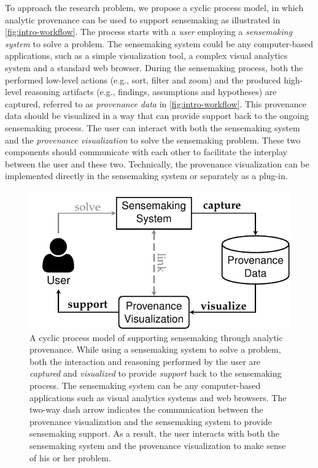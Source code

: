 To approach the research problem, we propose a cyclic process model, in which analytic provenance can be used to support sensemaking as illustrated in \autoref{fig:intro-workflow}. The process starts with a \emph{user} employing a \emph{sensemaking system} to solve a problem. The sensemaking system could be any computer-based applications, such as a simple visualization tool, a complex visual analytics system and a standard web browser. During the sensemaking process, both the performed low-level actions (e.g., sort, filter and zoom) and the produced high-level reasoning artifacts (e.g., findings, assumptions and hypotheses) are captured, referred to as \emph{provenance data} in \autoref{fig:intro-workflow}. This provenance data should be visualized in a way that can provide support back to the ongoing sensemaking process. The user can interact with both the sensemaking system and the \emph{provenance visualization} to solve the sensemaking problem. These two components should communicate with each other to facilitate the interplay between the user and these two. Technically, the provenance visualization can be implemented directly in the sensemaking system or separately as a plug-in.

\begin{figure}[!htb]
	\centering
	\includegraphics{workflow}
	\caption[A cyclic sensemaking-support model through analytic provenance]{A cyclic process model of supporting sensemaking through analytic provenance. While using a sensemaking system to solve a problem, both the interaction and reasoning performed by the user are \emph{captured} and \emph{visualized} to provide \emph{support} back to the sensemaking process. The sensemaking system can be any computer-based applications such as visual analytics systems and web browsers. The two-way dash arrow indicates the communication between the provenance visualization and the sensemaking system to provide sensemaking support. As a result, the user interacts with both the sensemaking system and the provenance visualization to make sense of his or her problem.}
	\label{fig:intro-workflow}
\end{figure}

